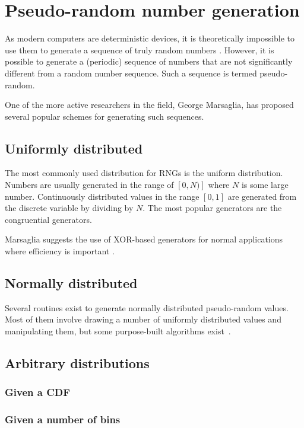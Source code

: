 
\section{Pseudo-random number generation}
As modern computers are deterministic devices, it is theoretically
impossible to use them to generate a sequence of truly random numbers
\citehere.  However, it is possible to generate a (periodic) sequence
of numbers that are not significantly different from a random number
sequence.  Such a sequence is termed pseudo-random.

One of the more active researchers in the field, George Marsaglia, has
proposed several popular schemes for generating such sequences.\citehere

\subsection{Uniformly distributed}
The most commonly used distribution for RNGs is the uniform distribution. 
Numbers are usually generated in the range of $[0, N)]$ where $N$ is some large
number.  Continuously distributed values in the range $[0,1]$ are generated from
the discrete variable by dividing  by  $N$. The most popular generators are the
congruential generators.



Marsaglia suggests the use of XOR-based generators for normal
applications where efficiency is important \citehere.

\subsection{Normally distributed}
Several routines exist to generate normally distributed pseudo-random
values.  Most of them involve drawing a number of uniformly
distributed values and manipulating them, but some purpose-built
algorithms exist~\citehere.

\subsection{Arbitrary distributions}
\subsubsection{Given a CDF}

\subsubsection{Given a number of bins}

